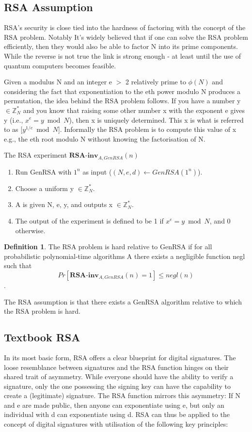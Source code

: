 \documentclass[]{final_report}
\theoremstyle{definition}
\newtheorem{definition}{Definition}[chapter]
\begin{document}
\subsection{RSA Assumption}
RSA's security is close tied into the hardness of factoring with the concept of the RSA problem. Notably It's widely believed that if one can solve the RSA problem efficiently, then they would also be able to factor N into its prime components. While the reverse is not true the link is strong enough - at least until the use of quantum computers becomes feasible.

Given a modulus N and an integer e $>$ 2 relatively prime to $\phi(N)$ and considering the fact that exponentiation to the eth power modulo N produces a permutation, the idea behind the RSA problem follows. If you have a number y $\in \mathbb{Z}^*_{N}$ and you know that raising some other number x with the exponent e gives y (i.e., $x^e = y \bmod N$), then x is uniquely determined. This x is what is referred to as [$y^{1/e} \bmod N$]. Informally the RSA problem is to compute this value of x e.g., the eth root modulo N without knowing the factorisation of N.

The RSA experiment $\textbf{RSA-inv}_{A,GenRSA}(n)$
\begin{enumerate}
    \item Run GenRSA with $1^n$ as input ($(N, e, d) \leftarrow GenRSA(1^n)$).
    \item Choose a uniform y $\in \mathbb{Z}^*_{N}$.
    \item A is given N, e, y, and outputs x $\in \mathbb{Z}^*_{N}$.
    \item The output of the experiment is defined to be 1 if $x^e = y \bmod N$, and 0 otherwise.
\end{enumerate}
\begin{definition} 
The RSA problem is hard relative to GenRSA if for all probabilistic polynomial-time algorithms A there exists a negligible function negl such that \[Pr[\textbf{RSA-inv}_{A,GenRSA}(n) = 1] \leq negl(n)\].
\end{definition}
The RSA assumption is that there exists a GenRSA algorithm relative to which the RSA problem is hard.
\subsection{Textbook RSA}
In its most basic form, RSA offers a clear blueprint for digital signatures. The loose resemblance between signatures and the RSA function hinges on their shared trait of asymmetry. While everyone should have the ability to verify a signature, only the one possessing the signing key can have the capability to create a (legitimate) signature. The RSA function mirrors this asymmetry: If N and e are made public, then anyone can exponentiate using e, but only an individual with d can exponentiate using d. RSA can thus be applied to the concept of digital signatures with utilisation of the following key principles:
\end{document}
